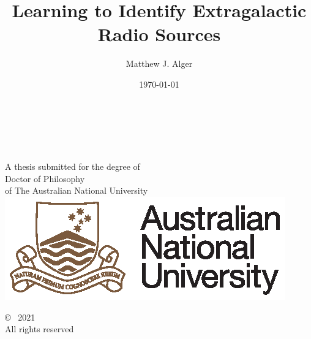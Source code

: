\documentclass[11pt, a4paper]{book}
\title{Learning to Identify Extragalactic Radio Sources}
\author{Matthew J. Alger}
\date{\today}
\begin{document}
\pagestyle{empty}
\thispagestyle{empty}

\begin{titlepage}
  \enlargethispage{2cm}
  \begin{center}
    \makeatletter
    \Huge\textbf{\@title} \\[.4cm]
    \Huge\textbf{\thesisqualifier} \\[2.5cm]
    \huge\textbf{\@author} \\[7cm]
    \makeatother
    \LARGE A thesis submitted for the degree of \\
    Doctor of Philosophy\\
    of The Australian National University \\
    \includegraphics{logo/ANU_LOGO_CMYK_56mm.eps}\\
    \thismonth
  \end{center}
\end{titlepage}


\vspace*{14cm}
\begin{center}
  \makeatletter
  \copyright\ \@author{} 2021\\All rights reserved
  \makeatother
\end{center}
\noindent
\begin{center}
  \footnotesize{~} %
\end{center}
\noindent

\newpage
\end{document}
